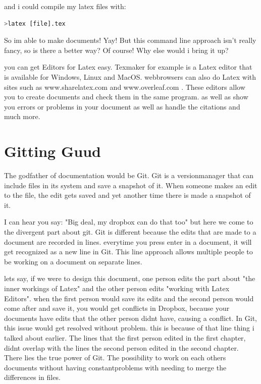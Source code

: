\documentclass{article}
\begin{document}
and i could compile my latex files with:

\begin{lstlisting}[language=bash]
	>latex [file].tex
\end{lstlisting}

So im able to make documents! Yay! But this command line approach isn't really fancy, so is there a better way? Of course! Why else would i bring it up?

you can get Editors for Latex easy. Texmaker for example is a Latex editor that is available for Windows, Linux and MacOS. webbrowsers can also do Latex with sites such as www.sharelatex.com and www.overleaf.com . These editors allow you to create documents and check them in the same program. as well as show you errors or problems in your document as well as handle the citations and much more.


\newpage
\section{Gitting Guud}
The godfather of documentation would be Git. Git is a versionmanager that can include files in its system and save a snapshot of it. When someone makes an edit to the file, the edit gets saved and yet another time there is made a snapshot of it.

I can hear you say: "Big deal, my dropbox can do that too" but here we come to the divergent part about git. Git is different because the edits that are made to a document are recorded in lines. everytime you press enter in a document, it will get recognized as a new line in Git. This line approach allows multiple people to be working on a document on separate lines. 

lets say, if we were to design this document, one person edits the part about "the inner workings of Latex" and the other person edits "working with Latex Editors". when the first person would save its edits and the second person would come after and save it, you would get conflicts in Dropbox, because your documents have edits that the other person didnt have, causing a conflict. In Git, this issue would get resolved without problem. this is because of that line thing i talked about earlier. The lines that the first person edited in the first chapter, didnt overlap with the lines the second person edited in the second chapter. There lies the true power of Git. The possibility to work on each others documents without having constantproblems with needing to merge the differences in files.
\end{document}
